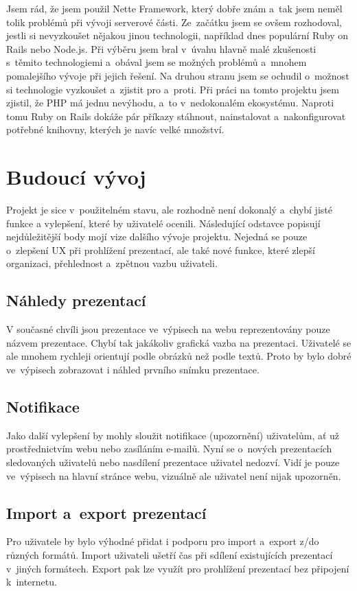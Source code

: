 \documentclass[11pt,twoside,a4paper]{book}
\begin{document}
Jsem rád, že jsem použil Nette Framework, který dobře znám a~tak jsem neměl tolik problémů při vývoji serverové části. Ze~začátku jsem se ovšem rozhodoval, jestli si nevyzkoušet nějakou jinou technologii, například dnes populární Ruby on Rails nebo Node.js. Při výběru jsem bral v~úvahu hlavně malé zkušenosti s~těmito technologiemi a~obával jsem se možných problémů a~mnohem pomalejšího vývoje při jejich řešení. Na druhou stranu jsem se ochudil o~možnost si technologie vyzkoušet a~zjistit pro a~proti. Při práci na tomto projektu jsem zjistil, že PHP má jednu nevýhodu, a~to v~nedokonalém ekosystému. Naproti tomu Ruby on Rails dokáže pár příkazy stáhnout, nainstalovat a~nakonfigurovat potřebné knihovny, kterých je navíc velké množství.

\section{Budoucí vývoj}
Projekt je sice v~použitelném stavu, ale rozhodně není dokonalý a~chybí jisté funkce a vylepšení, které by uživatelé ocenili. Následující odstavce popisují nejdůležitější body mojí vize dalšího vývoje projektu. Nejedná se pouze o~zlepšení UX při prohlížení prezentací, ale také nové funkce, které zlepší organizaci, přehlednost a~zpětnou vazbu uživateli.

\subsection{Náhledy prezentací}
V současné chvíli jsou prezentace ve~výpisech na webu reprezentovány pouze názvem prezentace. Chybí tak jakákoliv grafická vazba na prezentaci. Uživatelé se ale mnohem rychleji orientují podle obrázků než podle textů. Proto by bylo dobré ve~výpisech zobrazovat i náhled prvního snímku prezentace.

\subsection{Notifikace}
Jako další vylepšení by mohly sloužit notifikace (upozornění) uživatelům, ať už prostřednictvím webu nebo zasíláním e-mailů. Nyní se o~nových prezentacích sledovaných uživatelů nebo nasdílení prezentace uživatel nedozví. Vidí je pouze ve~výpisech na hlavní stránce webu, vizuálně ale uživatel není nijak upozorněn.

\subsection{Import a~export prezentací}
Pro uživatele by bylo výhodné přidat i podporu pro import a~export z/do různých formátů. Import uživateli ušetří čas při sdílení existujících prezentací v~jiných formátech. Export pak lze využít pro prohlížení prezentací bez připojení k~internetu.
\end{document}
